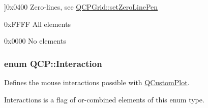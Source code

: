 \begin{Desc}
\begin{description}
{}]{\ttfamily 0x0400} Zero-\/lines, see \hyperlink{class_q_c_p_grid_a209f40fdb252397b418b82d3494d8ea0}{Q\+C\+P\+Grid\+::set\+Zero\+Line\+Pen} \item[{\em 
\hypertarget{namespace_q_c_p_ae55dbe315d41fe80f29ba88100843a0caa897c232a0ffc8368e7c100ffc59ef31}{}ae\+All\label{namespace_q_c_p_ae55dbe315d41fe80f29ba88100843a0caa897c232a0ffc8368e7c100ffc59ef31}
}]{\ttfamily 0x\+F\+F\+F\+F} All elements \item[{\em 
\hypertarget{namespace_q_c_p_ae55dbe315d41fe80f29ba88100843a0caa9e90d81896358757d94275aeaa58f6a}{}ae\+None\label{namespace_q_c_p_ae55dbe315d41fe80f29ba88100843a0caa9e90d81896358757d94275aeaa58f6a}
}]{\ttfamily 0x0000} No elements \end{description}
\end{Desc}
\hypertarget{namespace_q_c_p_a2ad6bb6281c7c2d593d4277b44c2b037}{}
\subsubsection[{Interaction}]{\setlength{\rightskip}{0pt plus 5cm}enum {\bf Q\+C\+P\+::\+Interaction}}\label{namespace_q_c_p_a2ad6bb6281c7c2d593d4277b44c2b037}
Defines the mouse interactions possible with \hyperlink{class_q_custom_plot}{Q\+Custom\+Plot}.

{\ttfamily Interactions} is a flag of or-\/combined elements of this enum type.

